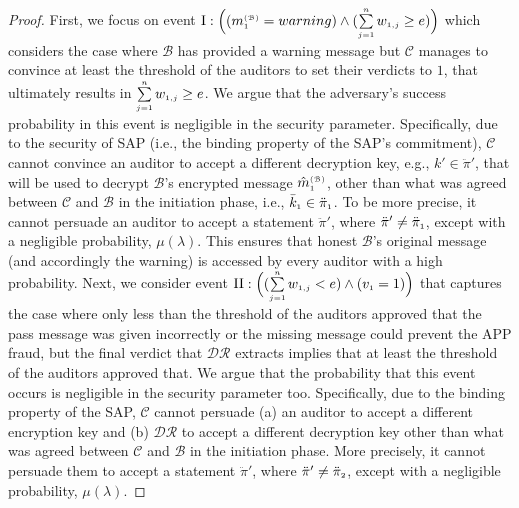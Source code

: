 \begin{proof}
 First, we focus on event $\text{\MakeUppercase{\romannumeral 1}}:  \Big((m^{\st\mathcal{(B)}}_{\st1}=warning) \wedge (\sum\limits_{\st j=1}^{\st n}w_{\st 1,j}\geq {e})\Big)$ which considers the case where $\mathcal{B}$ has provided a warning message but $\mathcal{C}$ manages to  convince at least the threshold of the auditors to set their verdicts to $1$,  that ultimately results in $\sum\limits_{\scriptscriptstyle j=1}^{\scriptscriptstyle n}w_{\scriptscriptstyle 1,j}\geq e$. We argue that the adversary's success probability in this event is negligible  in the security parameter. Specifically, due to the security of SAP (i.e., the binding property of the SAP's commitment), $\mathcal{C}$ cannot convince an auditor to accept a different decryption key, e.g., $k'\in \ddot\pi'$, that will be used to decrypt $\mathcal{B}$'s encrypted message $\hat {m}^{\scriptscriptstyle(\mathcal {B})}_{\scriptscriptstyle 1}$, other than what was agreed between $\mathcal{C}$ and $\mathcal{B}$ in the initiation phase, i.e., $\bar k_{\scriptscriptstyle 1}\in \ddot \pi_{\scriptscriptstyle 1}$.  To be more precise, it cannot persuade an auditor to accept a statement $\ddot \pi'$, where $\ddot \pi'\neq \ddot \pi_{\scriptscriptstyle 1}$, except with a negligible probability, $\mu(\lambda)$. This ensures that  honest $\mathcal{B}$’s original message (and accordingly the warning) is accessed by every auditor with a high probability. Next, we consider event  $\text{\MakeUppercase{\romannumeral 2}}:  \Big((\sum\limits_{\st j=1}^{\st n}w_{\st 1,j}<{e}) \wedge ( {v}_{\st 1}=1)\Big)$ that captures the case where only less than the  threshold of the auditors approved that the pass message was given incorrectly or the missing message could  prevent the APP fraud, but the final verdict that $\mathcal{DR}$ extracts implies that at least the threshold of the auditors approved that. We argue that the probability that this event occurs is negligible in the security parameter too. Specifically, due to the binding property of the SAP,  $\mathcal{C}$ cannot persuade (a)  an auditor to accept a different encryption key and (b) $\mathcal{DR}$ to accept a different decryption key other than what was agreed between $\mathcal{C}$ and $\mathcal{B}$ in the initiation phase. More precisely, it cannot persuade them to accept a statement $\ddot \pi'$, where $\ddot \pi'\neq \ddot \pi_{\scriptscriptstyle 2}$, except with a negligible probability, $\mu(\lambda)$. %
 

\end{proof}
